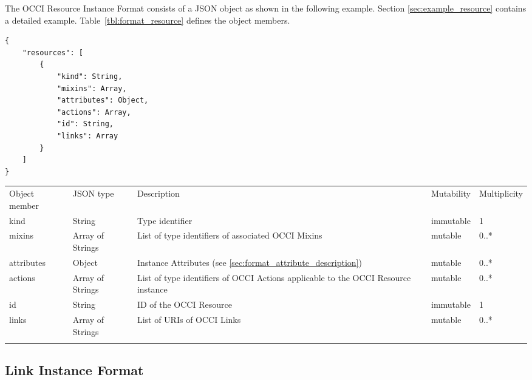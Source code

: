 \documentclass[10pt,a4paper]{article}
\begin{document}
The OCCI Resource Instance Format consists of a JSON object as shown in the
following example. Section \ref{sec:example_resource} contains a detailed
example.
Table~\ref{tbl:format_resource} defines the object members.
\begin{lstlisting}
{
    "resources": [
        {
            "kind": String,
            "mixins": Array,
            "attributes": Object,
            "actions": Array,
            "id": String,
            "links": Array
        }
    ]
}
\end{lstlisting}
 {
    \begin{tabularx}{\textwidth}{llXll}
    \toprule
    Object member & JSON type & Description & Mutability & Multiplicity \\
    \colrule
    kind & String & Type identifier & immutable & 1 \\

    mixins & Array of Strings & List of type identifiers of associated OCCI
Mixins  &
mutable & 0..* \\

    attributes & Object & Instance Attributes (see
\ref{sec:format_attribute_description}) & mutable & 0..* \\
    
    actions & Array of Strings & List of type identifiers of OCCI
Actions applicable to the OCCI Resource instance & mutable & 0..* \\
    
    id & String & ID of the OCCI Resource & immutable & 1\\
            
    links & Array of Strings & List of URIs of OCCI Links & mutable & 0..*\\
    \botrule
    \end{tabularx}
}

\subsection{Link Instance Format}
\label{sec:format_link}
\end{document}
